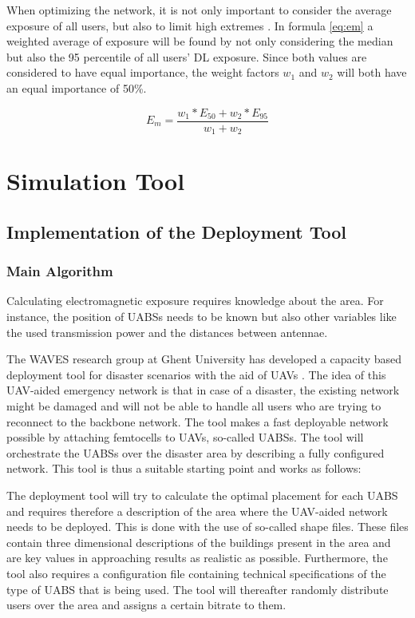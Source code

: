 When optimizing the network, it is not only important to consider the average exposure of all users, but also to limit high extremes \cite{J1}. 
In formula \ref{eq:em} a weighted average of exposure will be found by not only considering the median but also the 95 percentile of all users' DL exposure.
Since both values are considered to have equal importance, the weight factors $w_1$ and $w_2$ will both have an equal importance of 50\%. 

\begin{equation} 
E_m = \frac{w_1 * E_{50} + w_2 * E_{95}}{w_1 + w_2}
\label{eq:em}
\end{equation}


\section{Simulation Tool}

\subsection{Implementation of the Deployment Tool}
\label{sec:implementation:deploymenttool}
\subsubsection{Main Algorithm}

Calculating electromagnetic exposure requires knowledge about the area. 
For instance, the position of \gls{UABS}s needs to be known but also  other variables like
 the used transmission power and the distances between antennae.

The WAVES research group at Ghent University has developed a capacity based deployment tool for disaster scenarios with the aid of UAVs \cite{J2}.
The idea of this UAV-aided emergency network is that in case of a disaster, the existing network might be damaged and will not be able 
to handle all users who are trying to reconnect to the backbone network. 
The tool makes a fast deployable network possible by attaching femtocells to UAVs, so-called \gls{UABS}s.
The tool will orchestrate the \gls{UABS}s over the disaster area by describing a fully configured network.
This tool is thus a suitable starting point and works as follows:

The deployment tool will try to calculate the optimal placement for each \gls{UABS} and requires therefore a description of the area where the UAV-aided network needs to 
be deployed. This is done with the use of so-called shape files. These files contain three dimensional descriptions of the buildings present in the area and are
key values in approaching results as realistic as possible. Furthermore, the tool also requires a configuration file containing technical specifications of the type of \gls{UABS} that is being used. 
The tool will thereafter randomly distribute users over the area and assigns a certain bitrate to them.

